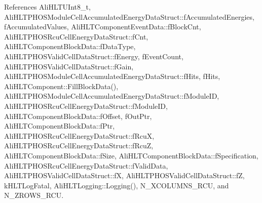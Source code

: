References Ali\-HLTUInt8\_\-t, Ali\-HLTPHOSModule\-Cell\-Accumulated\-Energy\-Data\-Struct::f\-Accumulated\-Energies, f\-Accumulated\-Values, Ali\-HLTComponent\-Event\-Data::f\-Block\-Cnt, Ali\-HLTPHOSRcu\-Cell\-Energy\-Data\-Struct::f\-Cnt, Ali\-HLTComponent\-Block\-Data::f\-Data\-Type, Ali\-HLTPHOSValid\-Cell\-Data\-Struct::f\-Energy, f\-Event\-Count, Ali\-HLTPHOSValid\-Cell\-Data\-Struct::f\-Gain, Ali\-HLTPHOSModule\-Cell\-Accumulated\-Energy\-Data\-Struct::f\-Hits, f\-Hits, Ali\-HLTComponent::Fill\-Block\-Data(), Ali\-HLTPHOSModule\-Cell\-Accumulated\-Energy\-Data\-Struct::f\-Module\-ID, Ali\-HLTPHOSRcu\-Cell\-Energy\-Data\-Struct::f\-Module\-ID, Ali\-HLTComponent\-Block\-Data::f\-Offset, f\-Out\-Ptr, Ali\-HLTComponent\-Block\-Data::f\-Ptr, Ali\-HLTPHOSRcu\-Cell\-Energy\-Data\-Struct::f\-Rcu\-X, Ali\-HLTPHOSRcu\-Cell\-Energy\-Data\-Struct::f\-Rcu\-Z, Ali\-HLTComponent\-Block\-Data::f\-Size, Ali\-HLTComponent\-Block\-Data::f\-Specification, Ali\-HLTPHOSRcu\-Cell\-Energy\-Data\-Struct::f\-Valid\-Data, Ali\-HLTPHOSValid\-Cell\-Data\-Struct::f\-X, Ali\-HLTPHOSValid\-Cell\-Data\-Struct::f\-Z, k\-HLTLog\-Fatal, Ali\-HLTLogging::Logging(), N\_\-XCOLUMNS\_\-RCU, and N\_\-ZROWS\_\-RCU.

